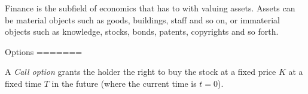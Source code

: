 Finance is the subfield of economics that has to with valuing
assets. Assets can be material objects such as goods, buildings, staff
and so on, or immaterial objects such as knowledge, stocks, bonds,
patents, copyrights and so forth.








Options
=======



A \textit{Call option} grants the holder the right to buy the stock at
a fixed price $K$ at a fixed time $T$ in the future (where the current
time is $t = 0$). 




